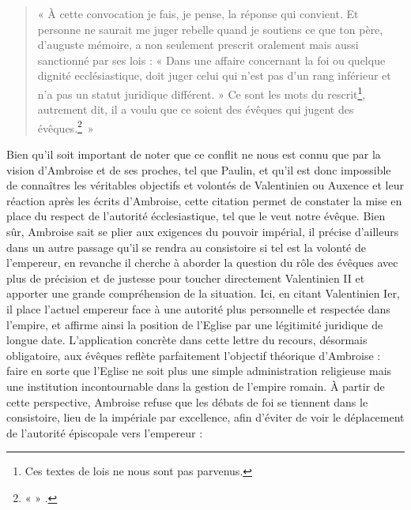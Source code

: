 \begin{quote}
    « À cette convocation je fais, je pense, la réponse qui convient. Et personne ne saurait me juger rebelle quand je soutiens ce que ton père, d’auguste mémoire, a non seulement prescrit oralement mais aussi sanctionné par ses lois : « Dans une affaire concernant la foi ou quelque dignité ecclésiastique, doit juger celui qui n’est pas d’un rang inférieur et n’a pas un statut juridique différent. » Ce sont les mots du rescrit\footnote{Ces textes de lois ne nous sont pas parvenus.}, autrement dit, il a voulu que ce soient des évêques qui jugent des évêques.\footnote{«  » \cite[,2]{ambroise_lettres}.}~»
\end{quote}

\bigskip

Bien qu’il soit important de noter que ce conflit ne nous est connu que par la vision d’Ambroise et de ses proches, tel que Paulin, et qu’il est donc impossible de connaîtres les véritables objectifs et volontés de Valentinien ou Auxence et leur réaction après les écrits d’Ambroise, cette citation permet de constater la mise en place du respect de l’autorité écclesiastique, tel que le veut notre évêque. Bien sûr, Ambroise sait se plier aux exigences du pouvoir impérial, il précise d’ailleurs dans un autre passage qu’il se rendra au consistoire si tel est la volonté de l’empereur, en revanche il cherche à aborder la question du rôle des évêques avec plus de précision et de justesse pour toucher directement Valentinien II et apporter une grande compréhension de la situation. Ici, en citant Valentinien Ier, il place l’actuel empereur face à une autorité plus personnelle et respectée dans l’empire, et affirme ainsi la position de l’Eglise par une légitimité juridique de longue date. L’application concrète dans cette lettre du recours, désormais obligatoire, aux évêques reflète parfaitement l’objectif théorique d’Ambroise : faire en sorte que l’Eglise ne soit plus une simple administration religieuse mais une institution incontournable dans la gestion de l’empire romain. À partir de cette perspective, Ambroise refuse que les débats de foi se tiennent dans le consistoire, lieu de la  impériale par excellence, afin d'éviter de voir le déplacement de l’autorité épiscopale vers  l’empereur :

